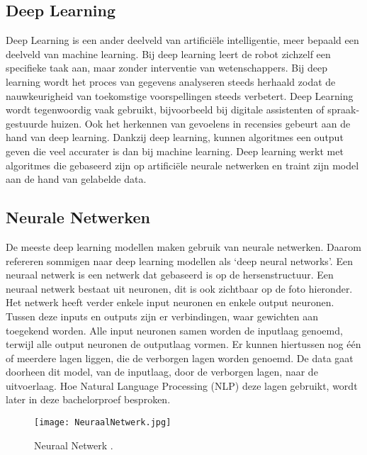 \subsection{Deep Learning}
\label{sec:deeplearning}
Deep Learning is een ander deelveld van artificiële intelligentie, meer bepaald een deelveld van machine learning. Bij deep learning leert de robot zichzelf een specifieke taak aan, maar zonder interventie van wetenschappers. \autocite{IBM2020} Bij deep learning wordt het proces van gegevens analyseren steeds herhaald zodat de nauwkeurigheid van toekomstige voorspellingen steeds verbetert. Deep Learning wordt tegenwoordig vaak gebruikt, bijvoorbeeld bij digitale assistenten of spraak-gestuurde huizen. \autocite{IBM2020}
Ook het herkennen van gevoelens in recensies gebeurt aan de hand van deep learning. 
Dankzij deep learning, kunnen algoritmes een output geven die veel accurater is dan bij machine learning. Deep learning werkt met algoritmes die gebaseerd zijn op artificiële neurale netwerken en traint zijn model aan de hand van gelabelde data.


\subsection{Neurale Netwerken}
\label{sec:neuralnetworks}

De meeste deep learning modellen maken gebruik van neurale netwerken. Daarom refereren sommigen naar deep learning modellen als ‘deep neural networks’. 
Een neuraal netwerk is een netwerk dat gebaseerd is op de hersenstructuur. Een neuraal netwerk bestaat uit neuronen, dit is ook zichtbaar op de foto hieronder. Het netwerk heeft verder enkele input neuronen en enkele output neuronen. Tussen deze inputs en outputs zijn er verbindingen, waar gewichten aan toegekend worden. Alle input neuronen samen worden de inputlaag genoemd, terwijl alle output neuronen de outputlaag vormen. Er kunnen hiertussen nog één of meerdere lagen liggen, die de verborgen lagen worden genoemd. De data gaat doorheen dit model, van de inputlaag, door de verborgen lagen, naar de uitvoerlaag. Hoe Natural Language Processing (NLP) deze lagen gebruikt, wordt later in deze bachelorproef besproken. \autocite{Vervoort2017}

\begin{figure}[!ht]
    \texttt{[image: NeuraalNetwerk.jpg]}
    \caption{\label{neuraalnetwerk}Neuraal Netwerk \autocite{KULeuven2019}.}
\end{figure}


